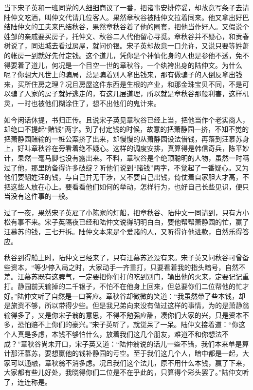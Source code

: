\documentclass[12pt,UTF8]{ctexbook}
\begin{document}
{{{当下宋子英和一班同党的人细细商议了一番，把诸事安排停妥，却故意写条子去请陆仲文吃酒，叫仲文代请几位客人。果然章秋谷被陆仲文拉着同来。他又拿出好巴结陆仲文的工夫来巴结秋谷，果然章秋谷着了他的圈套，把他当作好人。又假说个姓邹的亲戚要买房子，托仲文、秋谷二人代他留心寻觅。章秋谷并不疑心，和贡春树说了，同进城去看过房屋，就问价银。宋子英却故意一口允许，又说只要等姓萧的帐房一到就好先付定钱。这个道儿，凭你是个神仙化身的人也是参他不透，免不得要着了道儿，何况是一个目空一世的章秋谷，一个纨袴出身的陆仲文。为什么呢？你想大凡世上的骗局，总是骗着别人拿出钱来，那有做骗子的人倒反拿出钱来，买所住房之理？况且房屋这件东西是生根的产业，和那金珠宝贝不同，不是可以骗了人家的房子就好逃走的，有这几层道理，所以就是章秋谷那般利害，这样机灵，一时也被他们糊涂住了，想不出他们的鬼计来。

如今闲话休提，书归正传。且说宋子英见章秋谷已经上当，把他当作个老实商人，却绝口不提起“赌钱”两字。到了付定钱的时候，故意的把萧静园一挤，不知不觉的把萧静园赌输的一桩公案挤了出来，却慢慢的从萧静园设法借钱，再落到汪慕苏身上，好叫章秋谷在旁看着绝不疑心。这样的调度安排，真算得是韩信奇兵，陈平妙计，果然一毫马脚也没有露出来。不料，章秋谷是个绝顶聪明的人物，虽然一时瞒过了他，那里防备得许多破绽？听他们说到“赌钱”两字，不觉起了一番疑心。又为他们要翻姓汪的钱，与自己并无干涉，又不要自己出钱，倚仗着自家胆大才高，不把这些人放在心上。要看看他们如何的举动，怎样行为，也好自己长些见识，便只当没有这件事的一般。

过了一夜，果然宋子英雇了小陈家的灯船，把章秋谷、陆仲文一同请到，只有方小松有事不来。宋子英隔夜已经和陆仲文说得明明白白，要他帮帮萧静园的忙，赢了汪慕苏的钱，三七开拆。陆仲文本来是个爱赌的人，又听得许他进款，自然乐得答应。

秋谷到得船上时，陆仲文已经来了，只有汪慕苏还没有来。宋子英又问秋谷可曾备些资本，“等少停入局之时，大家动手一齐重打，只要看着我的指头暗号，自然不差。汪慕苏既有这脾气，一定要把你们打的吃到别门，输出他的火来，定要记记重打。静园前天输掉的二千银子，不怕不在他身上回来，但总要你们二位帮他的忙才好。”陆仲文听了自然是一口答应。章秋谷却微微的笑道：“我虽然带了些本钱，却是旅资不够，所以带得少些。但是我兄弟向来没有做过这样的事情，为的是萧静翁输得多了，又是你宋子翁的意思，不得不勉强应酬，凑你们大家的兴，只是资本不多，恐怕赔不上你们的豪兴。”宋子英听了，就觉呆了一呆。陆仲文接着道：“你这个人真是多虑，本钱不够怕什么，放着我们这几个朋友，难道不和你想法不成？”章秋谷尚未开口，宋子英又道：“陆仲翁说的话儿一些不错，我们本来单是算计那汪慕苏，要想赢他的钱补静园的亏空。至于我们这几个人，暗中都是一起，大家可以通融，章秋翁不消多虑。况且我们这个法儿，原不用什么本钱，赢了下来，大家都有些儿好处，我晓得你们二位是不在乎此的，只算得个彩头罢了。”陆仲文听了，连连称是。

}}}
\end{document}

